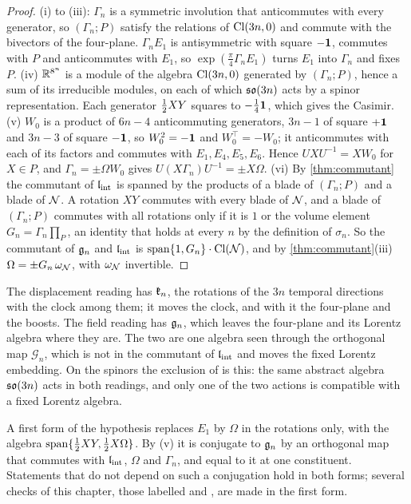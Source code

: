 \begin{proof}
(i) to (iii): $\Gamma_n$ is a symmetric involution that anticommutes with every generator, so $(\Gamma_n;P)$ satisfy the relations of
$\mathrm{Cl}(3n,0)$ and commute with the bivectors of the four-plane. $\Gamma_nE_1$ is antisymmetric with square $-\mathbf 1$, commutes with $P$ and
anticommutes with $E_1$, so $\exp(\tfrac\pi4\Gamma_nE_1)$ turns $E_1$ into $\Gamma_n$ and fixes $P$.
(iv) $\mathbb{R}^{8^n}$ is a module of the algebra $\mathrm{Cl}(3n,0)$ generated by $(\Gamma_n;P)$, hence a sum of its irreducible modules, on each of which
$\mathfrak{so}(3n)$ acts by a spinor representation. Each generator $\tfrac12 XY$ squares to $-\tfrac14\mathbf 1$, which gives the Casimir.
(v) $W_0$ is a product of $6n-4$ anticommuting generators, $3n-1$ of square $+\mathbf 1$ and $3n-3$ of square $-\mathbf 1$, so $W_0^2=-\mathbf 1$ and
$W_0^\top=-W_0$; it anticommutes with each of its factors and commutes with $E_1,E_4,E_5,E_6$. Hence $UXU^{-1}=XW_0$ for $X\in P$, and
$\Gamma_n=\pm\Omega W_0$ gives $U(X\Gamma_n)U^{-1}=\pm X\Omega$.
(vi) By \cref{thm:commutant} the commutant of $\mathfrak l_{\rm int}$ is spanned by the products of a blade of $(\Gamma_n;P)$ and a blade of $\mathcal N$. A
rotation $XY$ commutes with every blade of $\mathcal N$, and a blade of $(\Gamma_n;P)$ commutes with all rotations only if it is $1$ or the volume
element $G_n=\Gamma_n\prod_P$, an identity that holds at every $n$ by the definition of $\sigma_n$. So the commutant of $\mathfrak g_n$ and $\mathfrak l_{\rm int}$ is
$\mathrm{span}\{1,G_n\}\cdot\mathrm{Cl}(\mathcal N)$, and by \cref{thm:commutant}(iii) $\Omega=\pm G_n\,\omega_\mathcal N$, with $\omega_\mathcal N$ invertible.
\end{proof}

\begin{remark}
\label{rem:conditional}
The displacement reading has $\mathfrak k_n$, the rotations of the $3n$ temporal directions with the clock among them; it moves the clock, and with it
the four-plane and the boosts. The field reading has $\mathfrak g_n$, which leaves the four-plane and its Lorentz algebra where they are. The two are
one algebra seen through the orthogonal map $\mathcal G_n$, which is not in the commutant of $\mathfrak l_{\rm int}$ and moves the fixed Lorentz embedding.
On the spinors the exclusion of  is this: the same abstract algebra $\mathfrak{so}(3n)$ acts in both readings, and only one of the two
actions is compatible with a fixed Lorentz algebra.
\end{remark}

\begin{remark}
\label{rem:firstform}
A first form of the hypothesis replaces $E_1$ by $\Omega$ in the rotations only, with the algebra $\mathrm{span}\{\tfrac12 XY,\tfrac12 X\Omega\}$. By
(v) it is conjugate to $\mathfrak g_n$ by an orthogonal map that commutes with $\mathfrak l_{\rm int}$, $\Omega$ and $\Gamma_n$, and equal to it at one constituent.
Statements that do not depend on such a conjugation hold in both forms; several checks of this chapter, those labelled  and
, are made in the first form.
\end{remark}

